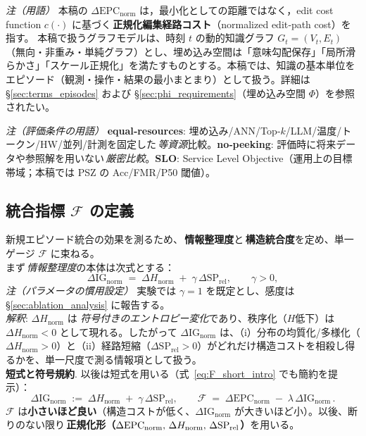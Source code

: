\documentclass[ja=standard,xelatex]{bxjsarticle}
\newcommand{\F}{\mathcal{F}}
\newcommand{\gednorm}{\Delta\mathrm{EPC}_{\mathrm{norm}}}
\newcommand{\ignorm}{\Delta\mathrm{IG}_{\mathrm{norm}}}
\begin{document}
\noindent\textit{注（用語）}\; 本稿の $\gednorm$ は，最小化としての距離ではなく，edit cost function $c(\cdot)$ に基づく\,\textbf{正規化編集経路コスト}（normalized edit‑path cost）を指す。
本稿で扱うグラフモデルは、時刻 $t$ の動的知識グラフ $G_t=(V_t,E_t)$（無向・非重み・単純グラフ）とし、埋め込み空間は「意味勾配保存」「局所滑らかさ」「スケール正規化」を満たすものとする。本稿では、知識の基本単位をエピソード（観測・操作・結果の最小まとまり）として扱う。詳細は \S\ref{sec:terms_episodes} および \S\ref{sec:phi_requirements}（埋め込み空間 $\Phi$）を参照されたい。

\noindent\textit{注（評価条件の用語）}\; \textbf{equal‑resources}: 埋め込み/ANN/Top‑$k$/LLM/温度/トークン/HW/並列/計測を固定した\,\emph{等資源}比較。\;\textbf{no‑peeking}: 評価時に将来データや参照解を用いない\,\emph{厳密比較}。\;\textbf{SLO}: Service Level Objective（運用上の目標帯域；本稿では PSZ の Acc/FMR/P50 閾値）。

\subsection{統合指標 $\F$ の定義}\label{sec:gauge_theory}
新規エピソード統合の効果を測るため、\,\textbf{情報整理度}と\,\textbf{構造統合度}を定め、単一ゲージ $\F$ に束ねる。
\\
まず\,\emph{情報整理度}の本体は次式とする：
\begin{equation}
\ignorm\;=\;\Delta H_{\mathrm{norm}}\; +\; \gamma\,\Delta \mathrm{SP}_{\mathrm{rel}},\qquad \gamma>0,\label{eq:ignorm_main}
\end{equation}
\noindent\textit{注（パラメータの慣用設定）}\; 実験では $\gamma{=}1$ を既定とし、感度は \S\ref{sec:ablation_analysis} に報告する。
\\
\noindent\textit{解釈}: $\Delta H_{\mathrm{norm}}$ は \emph{符号付きのエントロピー変化}であり、秩序化（$H$低下）は $\Delta H_{\mathrm{norm}}<0$ として現れる。したがって $\ignorm$ は、（i）分布の均質化/多様化（$\Delta H_{\mathrm{norm}}>0$）と（ii）経路短縮（$\Delta\mathrm{SP}_{\mathrm{rel}}>0$）がどれだけ構造コストを相殺し得るかを、単一尺度で測る情報項として扱う。
\\
\noindent\textbf{短式と符号規約}. 以後は短式を用いる（式~\ref{eq:F_short_intro} でも簡約を提示）：
\[
\Delta\mathrm{IG}_{\mathrm{norm}}\;:=\;\Delta H_{\mathrm{norm}}\; +\; \gamma\,\Delta\mathrm{SP}_{\mathrm{rel}},\qquad
\F\;=\;\gednorm\; -\; \lambda\,\Delta\mathrm{IG}_{\mathrm{norm}}\,.
\]
$\F$ は\textbf{小さいほど良い}（構造コストが低く、$\Delta\mathrm{IG}_{\mathrm{norm}}$ が大きいほど小）。以後、断りのない限り\,\textbf{正規化形（$\gednorm,\,\Delta H_{\rm norm},\,\Delta \mathrm{SP}_{\rm rel}$）}を用いる。
\end{document}
